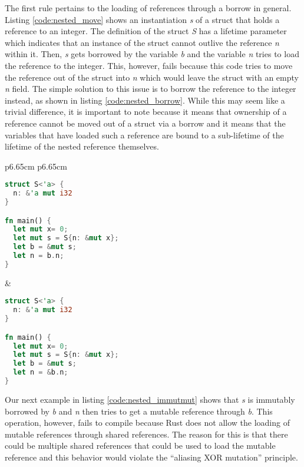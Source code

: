 The first rule pertains to the loading of references through a borrow in general.
Listing \ref{code:nested_move} shows an instantiation \textit{s} of a struct that holds a reference to an integer.
The definition of the struct \textit{S} has a lifetime parameter which indicates that an instance of the struct cannot outlive the reference \textit{n} within it.
Then, \textit{s} gets borrowed by the variable \textit{b} and the variable \textit{n} tries to load the reference to the integer.
This, however, fails because this code tries to move the reference out of the struct into \textit{n} which would leave the struct with an empty \textit{n} field.
The simple solution to this issue is to borrow the reference to the integer instead, as shown in listing \ref{code:nested_borrow}.
While this may seem like a trivial difference, it is important to note because it means that ownership of a reference cannot be moved out of a struct via a borrow and it means that the variables that have loaded such a reference are bound to a sub-lifetime of the lifetime of the nested reference themselves.
\begin{tabular}{p{6.65cm} p{6.65cm}}
    \begin{lstlisting}[language=Rust,frame=single,caption=Move reference.,label=code:nested_move]
struct S<'a> {
  n: &'a mut i32
}

fn main() {
  let mut x= 0;
  let mut s = S{n: &mut x};
  let b = &mut s;
  let n = b.n;
}
    \end{lstlisting}

    &

    \begin{lstlisting}[language=Rust,frame=single,caption=Borrow reference.,label=code:nested_borrow]
struct S<'a> {
  n: &'a mut i32
}

fn main() {
  let mut x= 0;
  let mut s = S{n: &mut x};
  let b = &mut s;
  let n = &b.n;
}
    \end{lstlisting}
\end{tabular}

Our next example in listing \ref{code:nested_immutmut} shows that \textit{s} is immutably borrowed by \textit{b} and \textit{n} then tries to get a mutable reference through \textit{b}.
This operation, however, fails to compile because Rust does not allow the loading of mutable references through shared references.
The reason for this is that there could be multiple shared references that could be used to load the mutable reference and this behavior would violate the ``aliasing XOR mutation'' principle.

